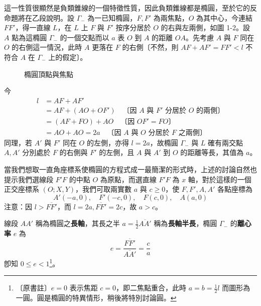 這一性質很顯然是負類錐線的一個特徵性質，因此負類錐線都是橢圓，至於它的反命題將在乙段說明。設 $\Gamma_-$ 為一已知橢圓，$F, F'$ 為兩焦點，$O$ 為其中心，今連結 $FF'$，得一直線 $L$，在 $L$ 上 $F$ 與 $F'$ 按序分居於 $O$ 的右與左兩側，如圖 1-2。設 $A$ 點為這橢圓 $\Gamma_-$ 的一個交點而以 $a$ 表 $O$ 到 $A$ 的距離 $OA$。先考慮 $A$ 與 $F$ 同在 $O$ 的右側這一情況，此時 $A$ 更落在 $F$ 的右側〔不然，則 $AF + AF' = FF' < l$ 不符合 $A$ 在 $\Gamma_-$ 上的假定〕。

\begin{figure}[htbp]
\centering
{}
\caption{橢圓頂點與焦點}
\label{fig:b4-3-2}
\end{figure}

今
\begin{align*}
l &= AF + AF' \\
  &= AF + (AO + OF') \quad \text{〔因 $A$ 與 $F'$ 分居於 $O$ 的兩側〕} \\
  &= (AF + FO) + AO \quad \text{〔因 $OF' = FO$〕} \\
  &= AO + AO = 2a \quad \text{〔因 $A$ 與 $O$ 分居於 $F$ 之兩側〕}
\end{align*}
同理，若 $A'$ 與 $F'$ 同在 $O$ 的左側，亦得 $l = 2a$，故橢圓 $\Gamma_-$ 與 $L$ 確有兩交點 $A, A'$ 分別處於 $F$ 的右側與 $F'$ 的左側，且 $A$ 與 $A'$ 到 $O$ 的距離等長，其值為 $a$。

當我們想取一直角座標系使橢圓的方程式成一最簡潔的形式時，上述的討論自然也提示我們選線段 $F'F$ 的中點 $O$ 為原點，而選直線 $F'F$ 為 $x$ 軸，對於這樣的一個正交座標系 $(O; X, Y)$，我們可取兩實數 $a$ 與 $c \ge 0$，使 $F, F', A, A'$ 各點座標為
\[ A'(-a,0), \quad F'(-c,0), \quad F(c,0), \quad A(a,0) \]
注意：因 $l > \overline{FF'}$，而 $l = 2a, \overline{FF'} = 2c$，故 $a > c$。

\begin{definition*}
線段 $AA'$ 稱為橢圓之\textbf{長軸}，其長之半 $a = \frac{1}{2}\overline{AA'}$ 稱為\textbf{長軸半長}，橢圓 $\Gamma_-$ 的\textbf{離心率} $e$ 為
\[ e = \frac{\overline{FF'}}{\overline{AA'}} = \frac{c}{a} \]
卽知 $0 \le e < 1$\label{note:b4-ch3-e-circle}\footnote{〔原書註〕$e=0$ 表示焦距 $c=0$，即二焦點重合，此時 $a=b=\frac{1}{2}l$ 而圖形為一圓。圓是橢圓的特異情形，稍後將特別討論圓。}。
\end{definition*}

